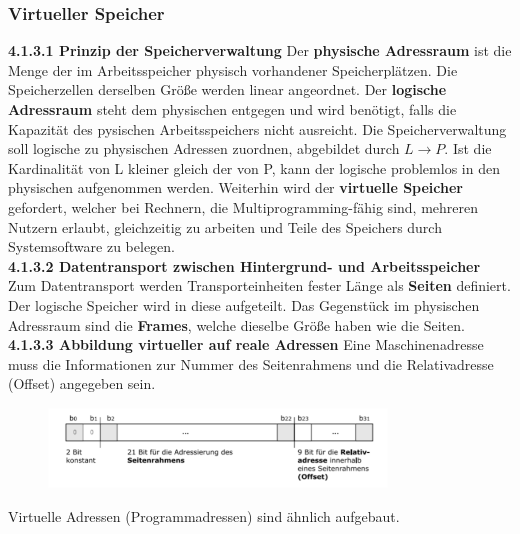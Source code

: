 \documentclass{article}
\begin{document}
\subsubsection{Virtueller Speicher}
    \textbf{4.1.3.1 Prinzip der Speicherverwaltung}\newline
    Der \textbf{physische Adressraum} ist die Menge der im Arbeitsspeicher physisch vorhandener Speicherplätzen. Die Speicherzellen derselben Größe werden linear angeordnet.\newline
    Der \textbf{logische Adressraum} steht dem physischen entgegen und wird benötigt, falls die Kapazität des pysischen Arbeitsspeichers nicht ausreicht.\newline
    Die Speicherverwaltung soll logische zu physischen Adressen zuordnen, abgebildet durch $L\rightarrow P$. Ist die Kardinalität von L kleiner gleich der von P, kann der logische problemlos in den physischen aufgenommen werden.\newline
    Weiterhin wird der \textbf{virtuelle Speicher} gefordert, welcher bei Rechnern, die Multiprogramming-fähig sind, mehreren Nutzern erlaubt, gleichzeitig zu arbeiten und Teile des Speichers durch Systemsoftware zu belegen.\newline
    \\
    \textbf{4.1.3.2 Datentransport zwischen Hintergrund- und Arbeitsspeicher}\newline
    Zum Datentransport werden Transporteinheiten fester Länge als \textbf{Seiten} definiert. Der logische Speicher wird in diese aufgeteilt.\newline
    Das Gegenstück im physischen Adressraum sind die \textbf{Frames}, welche dieselbe Größe haben wie die Seiten.\newline
    \\
    \textbf{4.1.3.3 Abbildung virtueller auf reale Adressen}\newline
    Eine Maschinenadresse muss die Informationen zur Nummer des Seitenrahmens und die Relativadresse (Offset) angegeben sein.
    \begin{figure}[H]
        \centering
	    \includegraphics[width=90mm]{Skizzen/3_Kapitel/maschinenadresse.png}
    \end{figure}\newline
    Virtuelle Adressen (Programmadressen) sind ähnlich aufgebaut.
\end{document}
